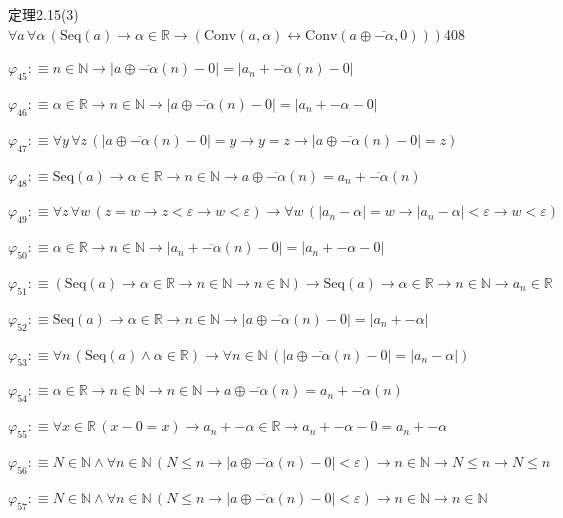 \begin{fullproof}{定理2.15(3)}{$\forall a\,\forall \alpha\,(\mathrm{Seq}(a) \to \alpha \in \mathbb{R} \to (\mathrm{Conv}(a,\alpha) \leftrightarrow \mathrm{Conv}(a \oplus \overline{-\alpha},0)))$}{408}
\begin{abbrevlist}
\item $\varphi_{45} :\equiv n \in \mathbb{N} \to \lvert a \oplus \overline{-\alpha}(n) - 0 \rvert = \lvert a_{n} + \overline{-\alpha}(n) - 0 \rvert$
\item $\varphi_{46} :\equiv \alpha \in \mathbb{R} \to n \in \mathbb{N} \to \lvert a \oplus \overline{-\alpha}(n) - 0 \rvert = \lvert a_{n} + -\alpha - 0 \rvert$
\item $\varphi_{47} :\equiv \forall y\,\forall z\,(\lvert a \oplus \overline{-\alpha}(n) - 0 \rvert = y \to y = z \to \lvert a \oplus \overline{-\alpha}(n) - 0 \rvert = z)$
\item $\varphi_{48} :\equiv \mathrm{Seq}(a) \to \alpha \in \mathbb{R} \to n \in \mathbb{N} \to a \oplus \overline{-\alpha}(n) = a_{n} + \overline{-\alpha}(n)$
\item $\varphi_{49} :\equiv \forall z\,\forall w\,(z = w \to z < \varepsilon \to w < \varepsilon) \to \forall w\,(\lvert a_{n} - \alpha \rvert = w \to \lvert a_{n} - \alpha \rvert < \varepsilon \to w < \varepsilon)$
\item $\varphi_{50} :\equiv \alpha \in \mathbb{R} \to n \in \mathbb{N} \to \lvert a_{n} + \overline{-\alpha}(n) - 0 \rvert = \lvert a_{n} + -\alpha - 0 \rvert$
\item $\varphi_{51} :\equiv (\mathrm{Seq}(a) \to \alpha \in \mathbb{R} \to n \in \mathbb{N} \to n \in \mathbb{N}) \to \mathrm{Seq}(a) \to \alpha \in \mathbb{R} \to n \in \mathbb{N} \to a_{n} \in \mathbb{R}$
\item $\varphi_{52} :\equiv \mathrm{Seq}(a) \to \alpha \in \mathbb{R} \to n \in \mathbb{N} \to \lvert a \oplus \overline{-\alpha}(n) - 0 \rvert = \lvert a_{n} + -\alpha \rvert$
\item $\varphi_{53} :\equiv \forall n\,(\mathrm{Seq}(a) \land \alpha \in \mathbb{R}) \to \forall n \in \mathbb{N}\,(\lvert a \oplus \overline{-\alpha}(n) - 0 \rvert = \lvert a_{n} - \alpha \rvert)$
\item $\varphi_{54} :\equiv \alpha \in \mathbb{R} \to n \in \mathbb{N} \to n \in \mathbb{N} \to a \oplus \overline{-\alpha}(n) = a_{n} + \overline{-\alpha}(n)$
\item $\varphi_{55} :\equiv \forall x \in \mathbb{R}\,(x - 0 = x) \to a_{n} + -\alpha \in \mathbb{R} \to a_{n} + -\alpha - 0 = a_{n} + -\alpha$
\item $\varphi_{56} :\equiv N \in \mathbb{N} \land \forall n \in \mathbb{N}\,(N \leq n \to \lvert a \oplus \overline{-\alpha}(n) - 0 \rvert < \varepsilon) \to n \in \mathbb{N} \to N \leq n \to N \leq n$
\item $\varphi_{57} :\equiv N \in \mathbb{N} \land \forall n \in \mathbb{N}\,(N \leq n \to \lvert a \oplus \overline{-\alpha}(n) - 0 \rvert < \varepsilon) \to n \in \mathbb{N} \to n \in \mathbb{N}$

\end{abbrevlist}
\end{fullproof}
